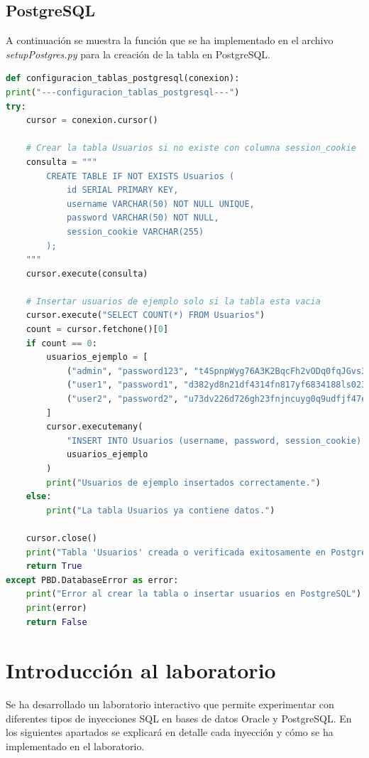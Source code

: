 \documentclass[a4paper,12pt]{article}
\begin{document}
\subsection{PostgreSQL}
A continuación se muestra la función que se ha implementado en el archivo \textit{setupPostgres.py} para la creación de la tabla en PostgreSQL.
\begin{lstlisting}[language=Python]
def configuracion_tablas_postgresql(conexion):
print("---configuracion_tablas_postgresql---")
try:
    cursor = conexion.cursor()

    # Crear la tabla Usuarios si no existe con columna session_cookie
    consulta = """
        CREATE TABLE IF NOT EXISTS Usuarios (
            id SERIAL PRIMARY KEY,
            username VARCHAR(50) NOT NULL UNIQUE,
            password VARCHAR(50) NOT NULL,
            session_cookie VARCHAR(255)
        );
    """
    cursor.execute(consulta)

    # Insertar usuarios de ejemplo solo si la tabla esta vacia
    cursor.execute("SELECT COUNT(*) FROM Usuarios")
    count = cursor.fetchone()[0]
    if count == 0:
        usuarios_ejemplo = [
            ("admin", "password123", "t4SpnpWyg76A3K2BqcFh2vODq0fqJGvs38ydh9"),
            ("user1", "password1", "d382yd8n21df4314fn817yf6834188ls023d8d"),
            ("user2", "password2", "u73dv226d726gh23fnjncuyg0q9udfjf47eueu")
        ]
        cursor.executemany(
            "INSERT INTO Usuarios (username, password, session_cookie) VALUES (%s, %s, %s)",
            usuarios_ejemplo
        )
        print("Usuarios de ejemplo insertados correctamente.")
    else:
        print("La tabla Usuarios ya contiene datos.")

    cursor.close()
    print("Tabla 'Usuarios' creada o verificada exitosamente en PostgreSQL")
    return True
except PBD.DatabaseError as error:
    print("Error al crear la tabla o insertar usuarios en PostgreSQL")
    print(error)
    return False
\end{lstlisting}


\section{Introducción al laboratorio}
Se ha desarrollado un laboratorio interactivo que permite experimentar con diferentes tipos de inyecciones SQL en bases de datos Oracle y PostgreSQL. 
En los siguientes apartados se explicará en detalle cada inyección y cómo se ha implementado en el laboratorio.
\end{document}
